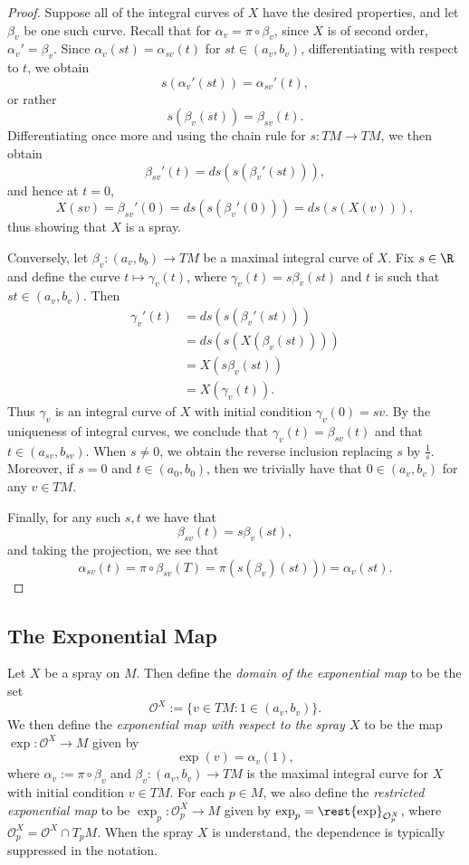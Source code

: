 \begin{proof}
Suppose all of the integral curves of $X$ have the desired properties, and let $\beta_v$ be one such curve.  Recall that for $\alpha_v=\pi\circ\beta_v$, since $X$ is of second order, $\alpha_v'=\beta_v$.  Since $\alpha_v(st)=\alpha_{sv}(t)$ for $st\in(a_v,b_v)$, differentiating with respect to $t$, we obtain
$$s(\alpha_v'(st))=\alpha_{sv}'(t),$$
or rather
$$s(\beta_v(st))=\beta_{sv}(t).$$
Differentiating once more and using the chain rule for $s:TM\to TM$, we then obtain
$$\beta_{sv}'(t)=ds(s(\beta_v'(st))),$$
and hence at $t=0$,
$$X(sv)=\beta_{sv}'(0)=ds(s(\beta_v'(0)))=ds(s(X(v))),$$
thus showing that $X$ is a spray.

Conversely, let $\beta_v:(a_v,b_b)\to TM$ be a maximal integral curve of $X$.  Fix $s\in\R$ and define the curve $t\mapsto\gamma_v(t)$, where $\gamma_v(t)=s\beta_v(st)$ and $t$ is such that $st\in(a_v,b_v)$.  Then
\begin{align*}
	\gamma_v'(t)&=ds(s(\beta_v'(st)))\\
	&=ds(s(X(\beta_v(st))))\\
	&=X(s\beta_v(st))\\
	&=X(\gamma_v(t)).
\end{align*}
Thus $\gamma_v$ is an integral curve of $X$ with initial condition $\gamma_v(0)=sv$.  By the uniqueness of integral curves, we conclude that $\gamma_v(t)=\beta_{sv}(t)$ and that $t\in(a_{sv},b_{sv})$.  When $s\neq0$, we obtain the reverse inclusion replacing $s$ by $\frac{1}{s}$.  Moreover, if $s=0$ and $t\in(a_0,b_0)$, then we trivially have that $0\in(a_v,b_v)$ for any $v\in TM$.

Finally, for any such $s,t$ we have that
$$\beta_{sv}(t)=s\beta_v(st),$$
and taking the projection, we see that
$$\alpha_{sv}(t)=\pi\circ\beta_{sv}(T)=\pi(s(\beta_v)(st)))=\alpha_v(st).$$  
\end{proof}



\subsection{The Exponential Map}

Let $X$ be a spray on $M$.  Then define the \textit{domain of the exponential map} to be the set 
$$\mathcal{O}^X:=\{v\in TM:1\in (a_v,b_v)\}.$$
We then define the \textit{exponential map with respect to the spray $X$} to be the map $\exp:\mathcal{O}^X\to M$ given by
$$\exp(v)=\alpha_v(1),$$
where $\alpha_v:=\pi\circ\beta_v$ and $\beta_v:(a_v,b_v)\to TM$ is the maximal integral curve for $X$ with initial condition $v\in TM$.  For each $p\in M$, we also define the \textit{restricted exponential map} to be $\exp_p:\mathcal{O}_p^X\to M$ given by $\exp_p=\rest{\exp}_{\mathcal{O}_p^X}$, where $\mathcal{O}_p^X=\mathcal{O}^X\cap T_pM$.  When the spray $X$ is understand, the dependence is typically suppressed in the notation.

